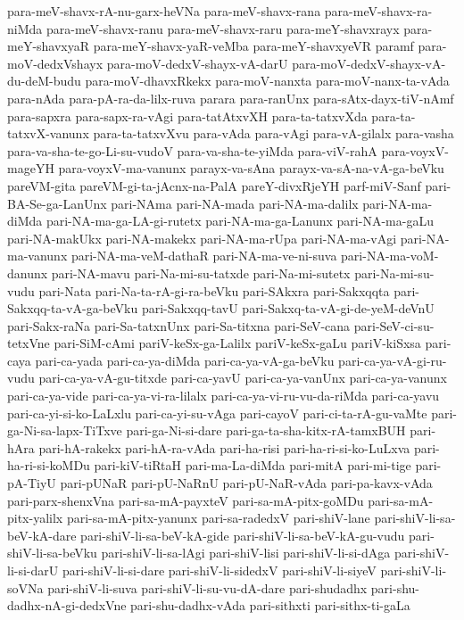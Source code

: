 {para-meV-shavx-rA-nu-garx-heVNa
para-meV-shavx-rana
para-meV-shavx-ra-niMda
para-meV-shavx-ranu
para-meV-shavx-raru
para-meY-shavxrayx
para-meY-shavxyaR
para-meY-shavx-yaR-veMba
para-meY-shavxyeVR
paramf
para-moV-dedxVshayx
para-moV-dedxV-shayx-vA-darU
para-moV-dedxV-shayx-vA-du-deM-budu
para-moV-dhavxRkekx
para-moV-nanxta
para-moV-nanx-ta-vAda
para-nAda
para-pA-ra-da-lilx-ruva
parara
para-ranUnx
para-sAtx-dayx-tiV-nAmf
para-sapxra
para-sapx-ra-vAgi
para-tatAtxvXH
para-ta-tatxvXda
para-ta-tatxvX-vanunx
para-ta-tatxvXvu
para-vAda
para-vAgi
para-vA-gilalx
para-vasha
para-va-sha-te-go-Li-su-vudoV
para-va-sha-te-yiMda
para-viV-rahA
para-voyxV-mageYH
para-voyxV-ma-vanunx
parayx-va-sAna
parayx-va-sA-na-vA-ga-beVku
pareVM-gita
pareVM-gi-ta-jAcnx-na-PalA
pareY-divxRjeYH
parf-miV-Sanf
pari-BA-Se-ga-LanUnx
pari-NAma
pari-NA-mada
pari-NA-ma-dalilx
pari-NA-ma-diMda
pari-NA-ma-ga-LA-gi-rutetx
pari-NA-ma-ga-Lanunx
pari-NA-ma-gaLu
pari-NA-makUkx
pari-NA-makekx
pari-NA-ma-rUpa
pari-NA-ma-vAgi
pari-NA-ma-vanunx
pari-NA-ma-veM-dathaR
pari-NA-ma-ve-ni-suva
pari-NA-ma-voM-danunx
pari-NA-mavu
pari-Na-mi-su-tatxde
pari-Na-mi-sutetx
pari-Na-mi-su-vudu
pari-Nata
pari-Na-ta-rA-gi-ra-beVku
pari-SAkxra
pari-Sakxqqta
pari-Sakxqq-ta-vA-ga-beVku
pari-Sakxqq-tavU
pari-Sakxq-ta-vA-gi-de-yeM-deVnU
pari-Sakx-raNa
pari-Sa-tatxnUnx
pari-Sa-titxna
pari-SeV-cana
pari-SeV-ci-su-tetxVne
pari-SiM-cAmi
pariV-keSx-ga-Lalilx
pariV-keSx-gaLu
pariV-kiSxsa
pari-caya
pari-ca-yada
pari-ca-ya-diMda
pari-ca-ya-vA-ga-beVku
pari-ca-ya-vA-gi-ru-vudu
pari-ca-ya-vA-gu-titxde
pari-ca-yavU
pari-ca-ya-vanUnx
pari-ca-ya-vanunx
pari-ca-ya-vide
pari-ca-ya-vi-ra-lilalx
pari-ca-ya-vi-ru-vu-da-riMda
pari-ca-yavu
pari-ca-yi-si-ko-LaLxlu
pari-ca-yi-su-vAga
pari-cayoV
pari-ci-ta-rA-gu-vaMte
pari-ga-Ni-sa-lapx-TiTxve
pari-ga-Ni-si-dare
pari-ga-ta-sha-kitx-rA-tamxBUH
pari-hAra
pari-hA-rakekx
pari-hA-ra-vAda
pari-ha-risi
pari-ha-ri-si-ko-LuLxva
pari-ha-ri-si-koMDu
pari-kiV-tiRtaH
pari-ma-La-diMda
pari-mitA
pari-mi-tige
pari-pA-TiyU
pari-pUNaR
pari-pU-NaRnU
pari-pU-NaR-vAda
pari-pa-kavx-vAda
pari-parx-shenxVna
pari-sa-mA-payxteV
pari-sa-mA-pitx-goMDu
pari-sa-mA-pitx-yalilx
pari-sa-mA-pitx-yanunx
pari-sa-radedxV
pari-shiV-lane
pari-shiV-li-sa-beV-kA-dare
pari-shiV-li-sa-beV-kA-gide
pari-shiV-li-sa-beV-kA-gu-vudu
pari-shiV-li-sa-beVku
pari-shiV-li-sa-lAgi
pari-shiV-lisi
pari-shiV-li-si-dAga
pari-shiV-li-si-darU
pari-shiV-li-si-dare
pari-shiV-li-sidedxV
pari-shiV-li-siyeV
pari-shiV-li-soVNa
pari-shiV-li-suva
pari-shiV-li-su-vu-dA-dare
pari-shudadhx
pari-shu-dadhx-nA-gi-dedxVne
pari-shu-dadhx-vAda
pari-sithxti
pari-sithx-ti-gaLa
}
